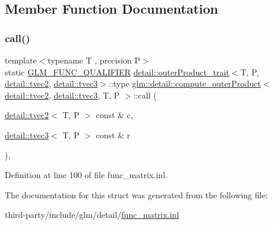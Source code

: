 \subsection{Member Function Documentation}
\mbox{\label{structglm_1_1detail_1_1compute__outer_product_3_01detail_1_1tvec2_00_01detail_1_1tvec3_00_01_t_00_01_p_01_4_af6f9ddad4215d4169d2cd021bd1769f4}} 
\subsubsection{\texorpdfstring{call()}{call()}}
{\footnotesize\ttfamily template$<$typename T , precision P$>$ \\
static \hyperlink{setup_8hpp_a33fdea6f91c5f834105f7415e2a64407}{G\+L\+M\+\_\+\+F\+U\+N\+C\+\_\+\+Q\+U\+A\+L\+I\+F\+I\+ER} \hyperlink{structglm_1_1detail_1_1outer_product__trait}{detail\+::outer\+Product\+\_\+trait}$<$T, P, \hyperlink{structglm_1_1detail_1_1tvec2}{detail\+::tvec2}, \hyperlink{structglm_1_1detail_1_1tvec3}{detail\+::tvec3}$>$\+::type \hyperlink{structglm_1_1detail_1_1compute__outer_product}{glm\+::detail\+::compute\+\_\+outer\+Product}$<$ \hyperlink{structglm_1_1detail_1_1tvec2}{detail\+::tvec2}, \hyperlink{structglm_1_1detail_1_1tvec3}{detail\+::tvec3}, T, P $>$\+::call (\begin{DoxyParamCaption}\item[{\hyperlink{structglm_1_1detail_1_1tvec2}{detail\+::tvec2}$<$ T, P $>$ const \&}]{c,  }\item[{\hyperlink{structglm_1_1detail_1_1tvec3}{detail\+::tvec3}$<$ T, P $>$ const \&}]{r }\end{DoxyParamCaption})\hspace{0.3cm}{\ttfamily [inline]}, {\ttfamily [static]}}



Definition at line 100 of file func\+\_\+matrix.\+inl.



The documentation for this struct was generated from the following file\+:\begin{DoxyCompactItemize}
\item 
third-\/party/include/glm/detail/\hyperlink{func__matrix_8inl}{func\+\_\+matrix.\+inl}\end{DoxyCompactItemize}
